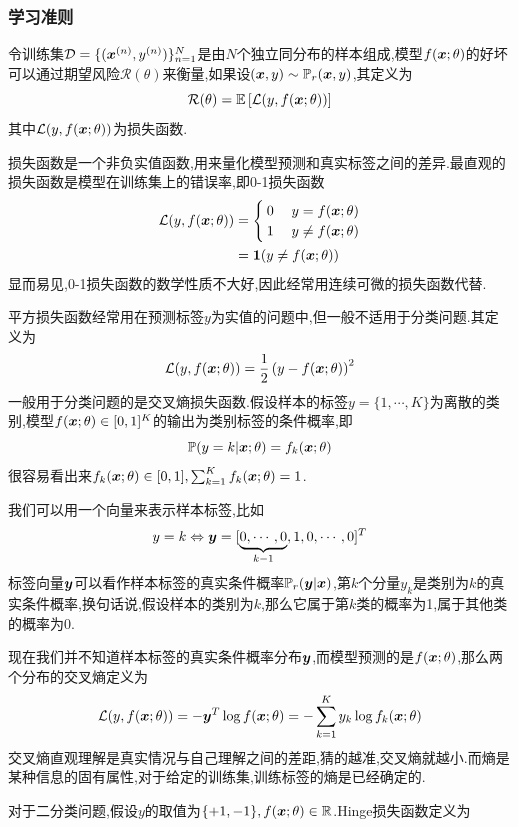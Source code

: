 \subsubsection{学习准则}
令训练集$\mathcal{D}=\{(\bm{x}^{(n)},y^{(n)})\}_{n=1}^N$是由$N$个独立同分布的样本组成,模型$f(\bm{x};\theta)$的好坏可以通过期望风险$\mathcal{R}(\theta)$来衡量,如果设$(\bm{x},y)\sim \mathbb{P}_r(\bm{x},y)$,其定义为
$$
\mathcal{R}(\theta)=\mathbb{E}\left[\mathcal{L}(y,f(\bm{x};\theta))\right]
$$
其中$\mathcal{L}(y,f(\bm{x};\theta))$为损失函数.\par
损失函数是一个非负实值函数,用来量化模型预测和真实标签之间的差异.最直观的损失函数是模型在训练集上的错误率,即0-1损失函数
$$
\begin{aligned}
    \mathcal{L}(y,f(\bm{x};\theta)) &=
    \begin{cases}
        0\; & y=f(\bm{x};\theta)\\
        1\; & y\neq f(\bm{x};\theta)
    \end{cases}\\
    &=\mathbf{1}(y\neq f(\bm{x};\theta))
\end{aligned}
$$
显而易见,0-1损失函数的数学性质不大好,因此经常用连续可微的损失函数代替.\par
平方损失函数经常用在预测标签$y$为实值的问题中,但一般不适用于分类问题.其定义为
$$
\mathcal{L}(y,f(\bm{x};\theta))= \frac{1}{2}\left(y-f(\bm{x};\theta)\right)^2
$$
\qquad 一般用于分类问题的是交叉熵损失函数.假设样本的标签$y=\{1,\cdots,K\}$为离散的类别,模型$f(\bm{x};\theta)\in [0,1]^K$的输出为类别标签的条件概率,即
$$
\mathbb{P}(y=k|\bm{x};\theta)=f_k(\bm{x};\theta)
$$
很容易看出来$f_k(\bm{x};\theta)\in [0,1],\sum_{k=1}^K f_k(\bm{x};\theta)=1$.\par
我们可以用一个向量来表示样本标签,比如
$$
y=k\Leftrightarrow \bm{y}=[\underbrace{0,\cdots,0}_{k-1}, 1,0,\cdots,0]^T
$$
标签向量$\bm{y}$可以看作样本标签的真实条件概率$\mathbb{P}_r(\bm{y}|\bm{x})$,第$k$个分量$y_k$是类别为$k$的真实条件概率,换句话说,假设样本的类别为$k$,那么它属于第$k$类的概率为1,属于其他类的概率为0.\par
现在我们并不知道样本标签的真实条件概率分布$\bm{y}$,而模型预测的是$f(\bm{x};\theta)$,那么两个分布的交叉熵定义为
$$
\mathcal{L}(y,f(\bm{x};\theta))=-\bm{y}^T\log f(\bm{x};\theta)=-\sum_{k=1}^K y_k\log f_k(\bm{x};\theta)
$$
\qquad 交叉熵直观理解是真实情况与自己理解之间的差距,猜的越准,交叉熵就越小.而熵是某种信息的固有属性,对于给定的训练集,训练标签的熵是已经确定的.\par
对于二分类问题,假设$y$的取值为$\{+1,-1\},f(\bm{x};\theta)\in\mathbb{R}$.Hinge损失函数定义为
